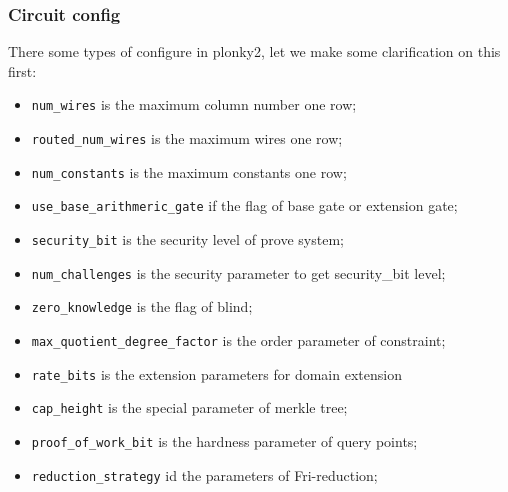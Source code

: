 \subsubsection{Circuit config} \label{sec:circuit-config}

There some types of configure in plonky2, let we make some clarification on this first:
\begin{itemize}
    \item \verb|num_wires| is the maximum column number one row;
    \item \verb|routed_num_wires| is the maximum wires one row;
    \item \verb|num_constants| is the maximum constants one row; 
    \item \verb|use_base_arithmeric_gate| if the flag of base gate or extension gate;
    \item \verb|security_bit| is the security level of prove system;
    \item \verb|num_challenges| is the security parameter to get security\_bit level;
    \item \verb|zero_knowledge| is the flag of blind;
    \item \verb|max_quotient_degree_factor| is the order parameter of constraint; 
    \item \verb|rate_bits| is the extension parameters for domain extension
    \item \verb|cap_height| is the special parameter of merkle tree;
    \item \verb|proof_of_work_bit| is the hardness parameter of query points;
    \item \verb|reduction_strategy| id the parameters of Fri-reduction;
\end{itemize}  


  
  
 
